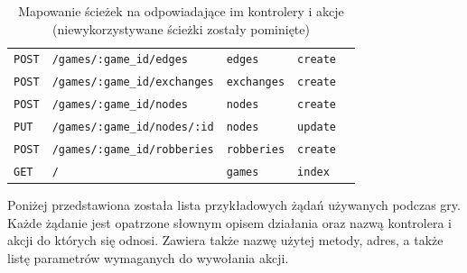 \documentclass[11pt,twoside]{report}
\begin{document}
\begin{table}[ht]
\begin{tabular}{|l|l|l|l|l|}
    \texttt{POST} & \texttt{/games/:game\_id/edges} & \texttt{edges} & \texttt{create} \\
    \texttt{POST} & \texttt{/games/:game\_id/exchanges} & \texttt{exchanges} & \texttt{create} \\
    \texttt{POST} & \texttt{/games/:game\_id/nodes} & \texttt{nodes} & \texttt{create} \\
    \texttt{PUT} & \texttt{/games/:game\_id/nodes/:id} & \texttt{nodes} & \texttt{update} \\
    \texttt{POST} & \texttt{/games/:game\_id/robberies} & \texttt{robberies} & \texttt{create} \\
    \texttt{GET} & \texttt{/} & \texttt{games} & \texttt{index} \\
    \hline
  \end{tabular}
  \caption{Mapowanie ścieżek na odpowiadające im kontrolery i
    akcje (niewykorzystywane ścieżki zostały pominięte)}
  \label{table:routes}
\end{table}

Poniżej przedstawiona została lista przykładowych żądań używanych
podczas gry. Każde żądanie jest opatrzone słownym opisem działania
oraz nazwą kontrolera i akcji do których się odnosi. Zawiera także
nazwę użytej metody, adres, a także listę parametrów wymaganych do
wywołania akcji.
\end{document}
